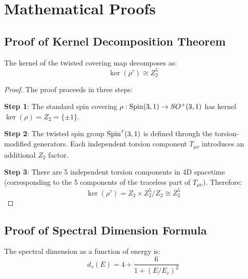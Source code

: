 \chapter{Mathematical Proofs}
\label{app:proofs}

\section{Proof of Kernel Decomposition Theorem}

\begin{theorem}
The kernel of the twisted covering map decomposes as:
\begin{equation}
    \ker(\rho^\tau) \cong Z_2^5
\end{equation}
\end{theorem}

\begin{proof}
The proof proceeds in three steps:

\textbf{Step 1}: The standard spin covering $\rho: \mathrm{Spin}(3,1) \to SO^+(3,1)$ has kernel $\ker(\rho) = Z_2 = \{\pm 1\}$.

\textbf{Step 2}: The twisted spin group $\mathrm{Spin}^\tau(3,1)$ is defined through the torsion-modified generators. Each independent torsion component $T_{\mu\nu}$ introduces an additional $Z_2$ factor.

\textbf{Step 3}: There are 5 independent torsion components in 4D spacetime (corresponding to the 5 components of the traceless part of $T_{\mu\nu}$). Therefore:
\begin{equation}
    \ker(\rho^\tau) = Z_2 \times Z_2^5 / Z_2 \cong Z_2^5
\end{equation}
\qedhere
\end{proof}

\section{Proof of Spectral Dimension Formula}

\begin{proposition}
The spectral dimension as a function of energy is:
\begin{equation}
    d_s(E) = 4 + \frac{6}{1 + (E/E_c)^2}
\end{equation}
\end{proposition}

